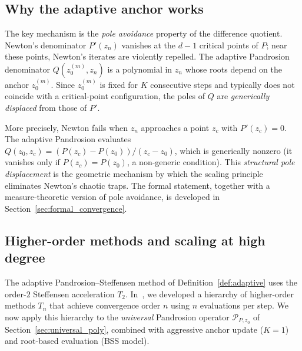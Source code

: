\documentclass[11pt,a4paper]{article}
\theoremstyle{definition}
\begin{document}
\subsection{Why the adaptive anchor works}

The key mechanism is the \emph{pole avoidance} property of the difference quotient.  Newton's denominator $P'(z_n)$ vanishes at the $d-1$ critical points of $P$; near these points, Newton's iterates are violently repelled.  The adaptive Pandrosion denominator $Q(z_0^{(m)}, z_n)$ is a polynomial in $z_n$ whose roots depend on the anchor $z_0^{(m)}$.  Since $z_0^{(m)}$ is fixed for $K$ consecutive steps and typically does not coincide with a critical-point configuration, the poles of $Q$ are \emph{generically displaced} from those of $P'$.

More precisely, Newton fails when $z_n$ approaches a point $z_c$ with $P'(z_c) = 0$.  The adaptive Pandrosion evaluates $Q(z_0, z_c) = (P(z_c) - P(z_0))/(z_c - z_0)$, which is generically nonzero (it vanishes only if $P(z_c) = P(z_0)$, a non-generic condition).  This \emph{structural pole displacement} is the geometric mechanism by which the scaling principle eliminates Newton's chaotic traps.  The formal statement, together with a measure-theoretic version of pole avoidance, is developed in Section~\ref{sec:formal_convergence}.

\subsection{Higher-order methods and scaling at high degree}
\label{sec:higher_order_smale}

The adaptive Pandrosion--Steffensen method of Definition~\ref{def:adaptive} uses the order-$2$ Steffensen acceleration $T_2$.  In~\cite{besevic2026ho}, we developed a hierarchy of higher-order methods $T_n$ that achieve convergence order $n$ using $n$ evaluations per step.  We now apply this hierarchy to the \emph{universal} Pandrosion operator $\mathcal{P}_{P,z_0}$ of Section~\ref{sec:universal_poly}, combined with aggressive anchor update ($K = 1$) and root-based evaluation (BSS model).
\end{document}
